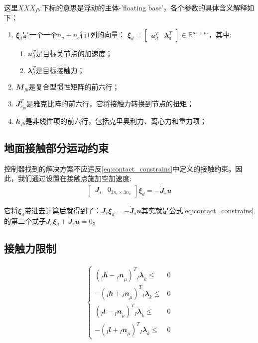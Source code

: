 这里$XXX_{fb}$:下标的意思是浮动的主体-'floating base'，各个参数的具体含义解释如下：

\begin{enumerate}
    \item ${\mathbfit \xi}_d$是一个一个$n_u+n_c$行$1$列的向量： ${\mathbfit \xi}_d = \begin{bmatrix} {\mathbfit u}_d^T & {\mathbfit \lambda}_d^T \end{bmatrix} \in {\mathbb R}^{n_u+n_c}$，其中:
    \begin{enumerate}
        \item ${\mathbfit u}_d^T$是目标关节点的加速度；
        \item ${\mathbfit \lambda}_d^T$是目标接触力；
    \end{enumerate}
    \item ${\mathbfit M}_{fb}$是复合型惯性矩阵的前六行；
    \item ${\mathbfit J}_{s_{fb}}^T$是雅克比阵的前六行，它将接触力转换到节点的扭矩；
    \item ${\mathbfit h}_{fb}$是非线性项的前六行，包括克里奥利力、离心力和重力项；
\end{enumerate}

\subsection[地面接触部分运动约束]{地面接触部分运动约束}

控制器找到的解决方案不应违反\eqref{eq:contact_constrains}中定义的接触约束。因此，我们通过设置在接触点施加空加速度:
\begin{align}
    \begin{bmatrix} {\mathbfit J}_s & {\mathbfit 0}_{3n_c \times 3n_c}\end{bmatrix} {\mathbfit \xi}_d = - \dot {\mathbfit J}_s {\mathbfit u} 
\end{align}

它将${\mathbfit \xi}_d$带进去计算后就得到了：${\mathbfit J}_s  {\mathbfit \xi}_d  = - \dot {\mathbfit J}_s {\mathbfit u}$其实就是公式\eqref{eq:contact_constrains}的第二个式子${\mathbfit J}_s  {\mathbfit \xi}_d  + \dot {\mathbfit J}_s {\mathbfit u} = 0$。

\subsection[接触力限制]{接触力限制}

\begin{align}
    \begin{cases}
        \label{eq:friction_constrains}
        (_I{\mathbfit h} - {_I{\mathbfit n}}_{\mu})^T {_I{\mathbfit \lambda}}_k\leq & 0 \\
        - (_I{\mathbfit h} + {_I{\mathbfit n}}_{\mu})^T {_I{\mathbfit \lambda}}_k\leq & 0 \\
        (_I{\mathbfit l} - {_I{\mathbfit n}}_{\mu})^T {_I{\mathbfit \lambda}}_k\leq & 0 \\
        - (_I{\mathbfit l} + {_I{\mathbfit n}}_{\mu})^T {_I{\mathbfit \lambda}}_k\leq & 0
    \end{cases}
\end{align}

